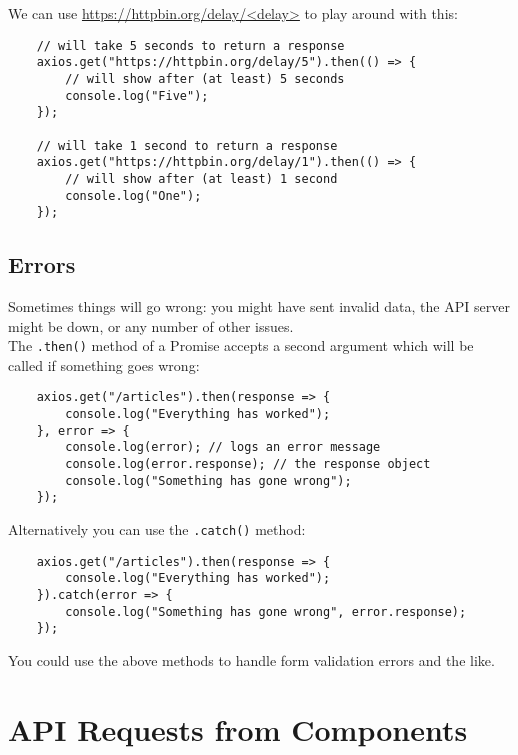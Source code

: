 We can use \href{https://httpbin.org/#/Dynamic_data/get_delay__delay_}{https://httpbin.org/delay/<delay>} to play around with this:

\begin{verbatim}
    // will take 5 seconds to return a response
    axios.get("https://httpbin.org/delay/5").then(() => {
        // will show after (at least) 5 seconds
        console.log("Five");
    });

    // will take 1 second to return a response
    axios.get("https://httpbin.org/delay/1").then(() => {
        // will show after (at least) 1 second
        console.log("One");
    });
\end{verbatim}



\subsection{Errors}

Sometimes things will go wrong: you might have sent invalid data, the API server might be down, or any number of other issues.
\\

The \texttt{.then()} method of a Promise accepts a second argument which will be called if something goes wrong:

\begin{verbatim}
    axios.get("/articles").then(response => {
        console.log("Everything has worked");
    }, error => {
        console.log(error); // logs an error message
        console.log(error.response); // the response object
        console.log("Something has gone wrong");
    });
\end{verbatim}

Alternatively you can use the \texttt{.catch()} method:

\begin{verbatim}
    axios.get("/articles").then(response => {
        console.log("Everything has worked");
    }).catch(error => {
        console.log("Something has gone wrong", error.response);
    });
\end{verbatim}

You could use the above methods to handle form validation errors and the like.

\section{API Requests from Components}

